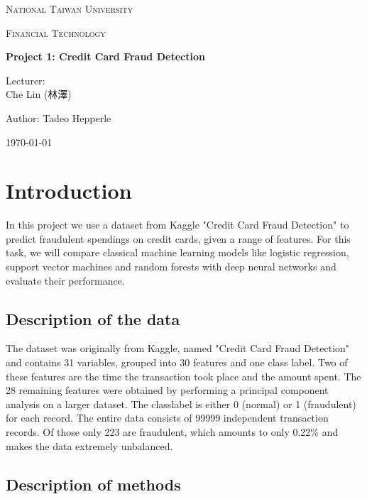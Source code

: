 \documentclass[utf8x]{ctexart}
\begin{document}
\begin{titlepage}
  \centering
  {\scshape\LARGE National Taiwan University \par}
  \vspace{1cm}
  {\scshape\Large Financial Technology \par}
  \vspace{2cm}
  {\huge\bfseries Project 1: Credit Card Fraud Detection\par}
  \vspace{2cm}
  {\Large Lecturer:\\
    Che Lin (林澤) \par}
  \vspace{1cm}
  {\Large Author: Tadeo Hepperle \par}
  \vfill
  {\large \today\par}
\end{titlepage}


\tableofcontents

\cleardoublepage

\section{Introduction}

In this project we use a dataset from Kaggle "Credit Card Fraud Detection" to predict fraudulent spendings on credit cards, given a range of features. For this task, we will compare classical machine learning models like logistic regression, support vector machines and random forests with deep neural networks and evaluate their performance.

\subsection{Description of the data}

The dataset was originally from Kaggle, named "Credit Card Fraud Detection" and contains 31 variables, grouped into 30 features and one class label. Two of these features are the time the transaction took place and the amount spent. The 28 remaining features were obtained by performing a principal component analysis on a larger dataset. The classlabel is either 0 (normal) or 1 (fraudulent) for each record. The entire data consists of 99999 independent transaction records. Of those only 223 are fraudulent, which amounts to only 0.22\% and makes the data extremely unbalanced.

\subsection{Description of methods}
\end{document}
